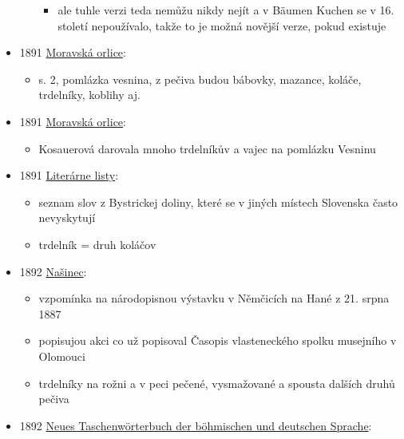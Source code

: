\begin{itemize}
\begin{itemize}
    \begin{itemize}
    \tightlist
    \item
      ale tuhle verzi teda nemůžu nikdy nejít a v Bäumen Kuchen se v 16.
      století nepoužívalo, takže to je možná novější verze, pokud
      existuje
    \end{itemize}
  \end{itemize}
\item
  1891
  \href{https://ceskadigitalniknihovna.cz/uuid/uuid:04e43cad-32f0-11de-992b-00145e5790ea}{Moravská
  orlice}:

  \begin{itemize}
  \tightlist
  \item
    s. 2, pomlázka vesnina, z pečiva budou bábovky, mazance, koláče,
    trdelníky, koblihy aj.
  \end{itemize}
\item
  1891
  \href{https://ceskadigitalniknihovna.cz/view/uuid:04e48ad6-32f0-11de-992b-00145e5790ea?page=uuid:27df031c-32f0-11de-992b-00145e5790ea&fulltext=vaje\%C4\%8D*\%20trdel*&source=mzk}{Moravská
  orlice}:

  \begin{itemize}
  \tightlist
  \item
    Kosauerová darovala mnoho trdelníkův a vajec na pomlázku Vesninu
  \end{itemize}
\item
  1891
  \href{https://www.google.cz/books/edition/Liter\%C3\%A1rne_listy/iTmko65VuoQC?hl=cs&gbpv=1&dq=trdeln\%C3\%ADk&pg=RA5-PA64&printsec=frontcover}{Literárne
  listy}:

  \begin{itemize}
  \tightlist
  \item
    seznam slov z Bystrickej doliny, které se v jiných místech Slovenska
    často nevyskytují
  \item
    trdelník = druh koláčov
  \end{itemize}
\item
  1892
  \href{https://ceskadigitalniknihovna.cz/uuid/uuid:852faf14-821a-11e0-b92b-0050569d679d}{Našinec}:

  \begin{itemize}
  \tightlist
  \item
    vzpomínka na národopisnou výstavku v Němčicích na Hané z 21. srpna
    1887
  \item
    popisujou akci co už popisoval Časopis vlasteneckého spolku
    musejního v Olomouci
  \item
    trdelníky na rožni a v peci pečené, vysmažované a spousta dalších
    druhů pečiva
  \end{itemize}
\item
  1892
  \href{https://ceskadigitalniknihovna.cz/uuid/uuid:0869a320-dc1a-11e6-9e7e-001018b5eb5c}{Neues
  Taschenwörterbuch der böhmischen und deutschen Sprache}:


\end{itemize}

